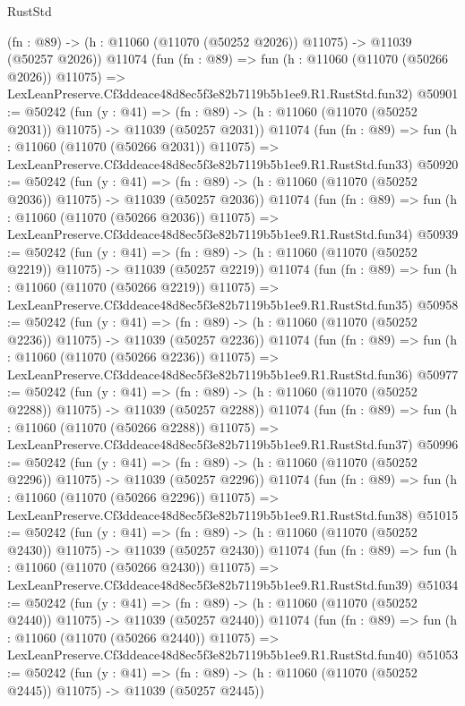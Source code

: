 \begin{lexlean}{RustStd}
\begin{coremodule}
    (fn : @89) -> (h : @11060 (@11070 (@50252 @2026)) @11075) -> @11039 (@50257 @2026))
    @11074
    (fun (fn : @89) =>
    fun (h : @11060 (@11070 (@50266 @2026)) @11075) =>
    LexLeanPreserve.Cf3ddeace48d8ec5f3e82b7119b5b1ee9.R1.RustStd.fun32)
@50901 := @50242
    (fun (y : @41) =>
    (fn : @89) -> (h : @11060 (@11070 (@50252 @2031)) @11075) -> @11039 (@50257 @2031))
    @11074
    (fun (fn : @89) =>
    fun (h : @11060 (@11070 (@50266 @2031)) @11075) =>
    LexLeanPreserve.Cf3ddeace48d8ec5f3e82b7119b5b1ee9.R1.RustStd.fun33)
@50920 := @50242
    (fun (y : @41) =>
    (fn : @89) -> (h : @11060 (@11070 (@50252 @2036)) @11075) -> @11039 (@50257 @2036))
    @11074
    (fun (fn : @89) =>
    fun (h : @11060 (@11070 (@50266 @2036)) @11075) =>
    LexLeanPreserve.Cf3ddeace48d8ec5f3e82b7119b5b1ee9.R1.RustStd.fun34)
@50939 := @50242
    (fun (y : @41) =>
    (fn : @89) -> (h : @11060 (@11070 (@50252 @2219)) @11075) -> @11039 (@50257 @2219))
    @11074
    (fun (fn : @89) =>
    fun (h : @11060 (@11070 (@50266 @2219)) @11075) =>
    LexLeanPreserve.Cf3ddeace48d8ec5f3e82b7119b5b1ee9.R1.RustStd.fun35)
@50958 := @50242
    (fun (y : @41) =>
    (fn : @89) -> (h : @11060 (@11070 (@50252 @2236)) @11075) -> @11039 (@50257 @2236))
    @11074
    (fun (fn : @89) =>
    fun (h : @11060 (@11070 (@50266 @2236)) @11075) =>
    LexLeanPreserve.Cf3ddeace48d8ec5f3e82b7119b5b1ee9.R1.RustStd.fun36)
@50977 := @50242
    (fun (y : @41) =>
    (fn : @89) -> (h : @11060 (@11070 (@50252 @2288)) @11075) -> @11039 (@50257 @2288))
    @11074
    (fun (fn : @89) =>
    fun (h : @11060 (@11070 (@50266 @2288)) @11075) =>
    LexLeanPreserve.Cf3ddeace48d8ec5f3e82b7119b5b1ee9.R1.RustStd.fun37)
@50996 := @50242
    (fun (y : @41) =>
    (fn : @89) -> (h : @11060 (@11070 (@50252 @2296)) @11075) -> @11039 (@50257 @2296))
    @11074
    (fun (fn : @89) =>
    fun (h : @11060 (@11070 (@50266 @2296)) @11075) =>
    LexLeanPreserve.Cf3ddeace48d8ec5f3e82b7119b5b1ee9.R1.RustStd.fun38)
@51015 := @50242
    (fun (y : @41) =>
    (fn : @89) -> (h : @11060 (@11070 (@50252 @2430)) @11075) -> @11039 (@50257 @2430))
    @11074
    (fun (fn : @89) =>
    fun (h : @11060 (@11070 (@50266 @2430)) @11075) =>
    LexLeanPreserve.Cf3ddeace48d8ec5f3e82b7119b5b1ee9.R1.RustStd.fun39)
@51034 := @50242
    (fun (y : @41) =>
    (fn : @89) -> (h : @11060 (@11070 (@50252 @2440)) @11075) -> @11039 (@50257 @2440))
    @11074
    (fun (fn : @89) =>
    fun (h : @11060 (@11070 (@50266 @2440)) @11075) =>
    LexLeanPreserve.Cf3ddeace48d8ec5f3e82b7119b5b1ee9.R1.RustStd.fun40)
@51053 := @50242
    (fun (y : @41) =>
    (fn : @89) -> (h : @11060 (@11070 (@50252 @2445)) @11075) -> @11039 (@50257 @2445))

\end{coremodule}
\end{lexlean}
